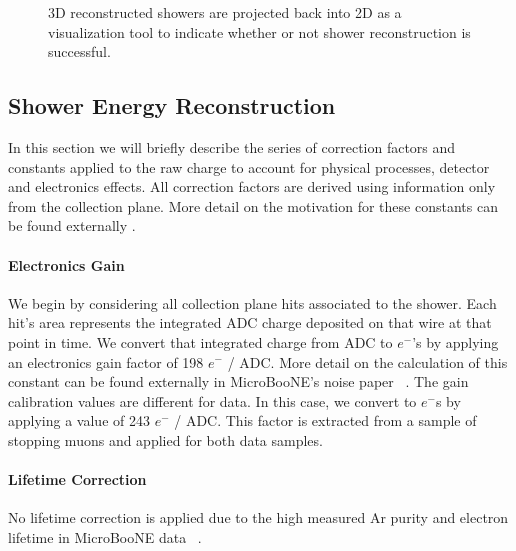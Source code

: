 \begin{figure}[h!] %
\centering
{}
\caption{3D reconstructed showers are projected back into 2D as a visualization tool to indicate whether or not shower reconstruction is successful. }
\label{fig:showers}
\end{figure}

\subsection{Shower Energy Reconstruction}
\label{sec:ereco}
\par In this section we will briefly describe the series of correction factors and constants applied to the raw charge to account for physical processes, detector and electronics effects. All correction factors are derived using information only from the collection plane.  More detail on the motivation for these constants can be found externally \cite{bib:davidc_energycalibration}\cite{bib:davidc_recomb}.

\paragraph{Electronics Gain} 
We begin by considering all collection plane hits associated to the shower.  Each hit's area represents the integrated ADC charge deposited on that wire at that point in time.  We convert that integrated charge from ADC to $e^-$'s by applying an electronics gain factor of 198 $e^-$ / ADC. More detail on the calculation of this constant can be found externally in MicroBooNE's noise paper ~\cite{bib:noise}.  
\noindent The gain calibration values are different for data. In this case, we convert to $e^-$s by applying a value of 243 $e^-$ / ADC.  This factor is extracted from a sample of stopping muons and applied for both data samples.   
\paragraph{ Lifetime Correction} No lifetime correction is applied due to the high measured Ar purity and electron lifetime in MicroBooNE data ~\cite{bib:purity}. 
